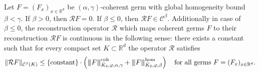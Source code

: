 \begin{theorem}\label{theorem:rec-and-negative-hoelder}
  Let \( F = (F_x)_{x \in \mathbb{R}^d} \) be \( (\alpha, \gamma) \)-coherent germ with global homogeneity bound \( \beta < \gamma \). If \( \beta > 0 \), then \( \mathcal{R}F = 0 \). If \( \beta \leq 0 \), then \( \mathcal{R}F \in \mathcal{C}^\beta \). Additionally in case of \( \beta \leq 0 \), the reconstruction operator \( \mathcal{R} \) which maps coherent germs \( F \) to their reconstruction \( \mathcal{R}F \) is continuous in the following sense: there exists a constant such that for every compact set \( K \subset \mathbb{R}^d \) the operator \( \mathcal{R} \) satisfies
  \begin{gather}\label{equation:rec-and-negative-hoelder}
    \lVert \mathcal{R}F \rVert_{\mathcal{C}^\beta(K)} \leq \left\{ \mathrm{constant} \right\} \cdot \left( 
        {\left\vert\kern-0.25ex\left\vert\kern-0.25ex\left\vert F \right\vert\kern-0.25ex\right\vert\kern-0.25ex\right\vert}^{\mathrm{coh}}_{\bar{K}_{4}, \varphi, \alpha, \gamma} + {\left\vert\kern-0.25ex\left\vert\kern-0.25ex\left\vert F \right\vert\kern-0.25ex\right\vert\kern-0.25ex\right\vert}^{\mathrm{\hom}}_{\bar{K}_{2}, \varphi, \beta}
     \right) \quad \text{for all germs \( F = (F_x)_{x \in \mathbb{R}^d} \)}.
  \end{gather}
\end{theorem}

